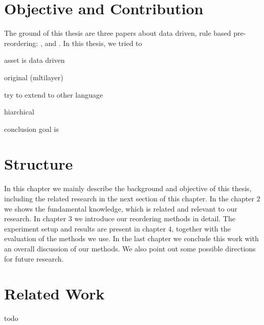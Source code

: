 \section{Objective and Contribution}
\label{ch:Introduction:sec:ObjectiveAndContribution}

The ground of this thesis are three papers about data driven, rule based pre-reordering: \cite{short}, \cite{long} and \cite{tree}. In this thesis, we tried to 

asset is data driven

original (mltilayer)

try to extend to other language

hiarchical \cite{hier}

conclusion goal is

\section{Structure}
\label{ch:Introduction:sec:Structure}

In this chapter we mainly describe the background and objective of this thesis, including the related research in the next section of this chapter. In the chapter $2$ we shows the fundamental knowledge, which is related and relevant to our research. In chapter $3$ we introduce our reordering methods in detail. The experiment setup and results are present in chapter $4$, together with the evaluation of the methods we use. In the last chapter we conclude this work with an overall discussion of our methods. We also point out some possible directions for future research.

\section{Related Work}
\label{ch:Introduction:sec:RelatedWork}

todo